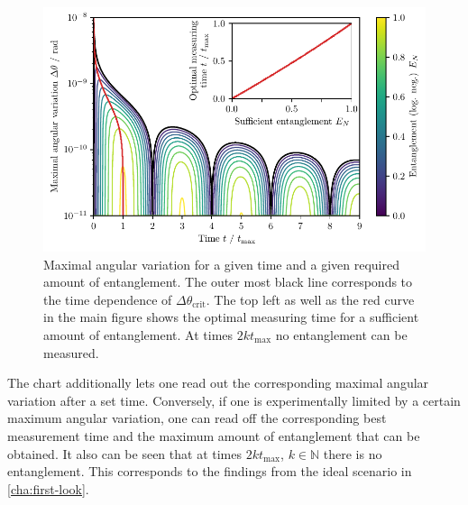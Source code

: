\begin{figure}[!htbp]
  \centering
  \includegraphics[width=\textwidth]{./../figures/theta-variance/time-delta-theta-crit-EN.pdf}
  \caption{Maximal angular variation for a given time and a given required amount of entanglement. The outer most black line corresponds to the time dependence of $\Delta \theta_\mathrm{crit}$. The top left as well as the red curve in the main figure shows the optimal measuring time for a sufficient amount of entanglement.
  At times $2k t_\mathrm{max}$ no entanglement can be measured.}
  \label{fig:4:time-delta-theta}
\end{figure}
The chart additionally lets one read out the corresponding maximal angular variation after a set time.
Conversely, if one is experimentally limited by a certain maximum angular variation, one can read off the corresponding best measurement time and the maximum amount of entanglement that can be obtained.
It also can be seen that at times $2k t_\mathrm{max}$, $k\in\mathbb{N}$ there is no entanglement. This corresponds to the findings from the ideal scenario in \cref{cha:first-look}. 